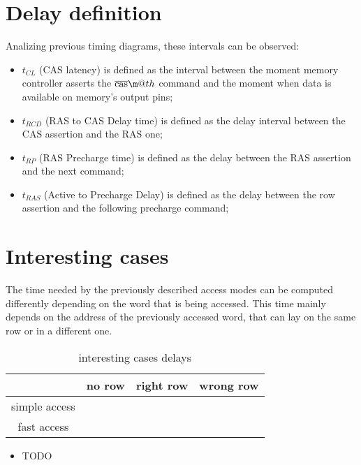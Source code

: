 \documentclass[a4paper,12pt]{article}
\makeatletter
\newcommand*{\textoverline}[1]{$\overline{\hbox{#1}}\m@th$}
\makeatother
\begin{document}
\section{Delay definition}
Analizing previous timing diagrams, these intervals can be observed:
\begin{itemize}
  \item $t_{CL}$ (CAS latency) is defined as the interval between the moment memory controller asserts the \emph{\textoverline{cas}} command and the moment when data is available on memory's output pins;
  \item $t_{RCD}$ (RAS to CAS Delay time) is defined as the delay interval between the CAS assertion and the RAS one;
  \item $t_{RP}$ (RAS Precharge time) is defined as the delay between the RAS assertion and the next command;
  \item $t_{RAS}$ (Active to Precharge Delay) is defined as the delay between the row assertion and the following precharge command;
\end{itemize}

\section{Interesting cases}
The time needed by the previously described access modes can be computed differently depending on the word that is being accessed.
This time mainly depends on the address of the previously accessed word, that can lay on the same row or in a different one.

\begin{table}[H]
\centering
\begin{tabular}{| c | c | c | c |}\hline
                & no row & right row & wrong row \\ \hline
  simple access & & & \\ \hline
  fast access & & & \\ \hline
\end{tabular}
\caption{interesting cases delays}
\end{table}

\begin{itemize}
  \item TODO
\end{itemize}
\end{document}
